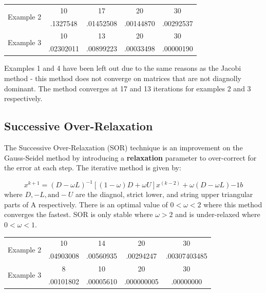 \documentclass[11pt]{article}	%
\begin{document}
\begin{center}
    \begin{tabular}{||c|c|c|c|c||}
        \hline
        \multirow{2}{5em}{Example 2} & 10 & 17 & 20 & 30 \\ [.25em]
        & .1327548 & .01452508 & .00144870 & .00292537 \\ [.25em]
        \hline \hline
        \multirow{2}{5em}{Example 3} & 10 & 13 & 20 & 30 \\ [.25em]
        & .02302011 & .00899223 & .00033498 & .00000190 \\ [.25em]
        \hline
    \end{tabular}
\end{center}
Examples 1 and 4 have been left out due to the same reasons as the Jacobi method - this method does not converge on matrices that are not diagnolly dominant. The method converges at 17 and 13 iterations for examples 2 and 3 respectively.

\subsection{Successive Over-Relaxation}
The Successive Over-Relaxation (SOR) technique is an improvement on the Gauss-Seidel method by introducing a \textbf{relaxation} parameter to over-correct for the error at each step. The iterative method is given by:

\begin{equation}\label{eq:successive-over-relax-eq-1}
    x^{k+1} = (D - \omega L)^{-1}[(1 - \omega)D + \omega U]x^{(k-2)} + \omega(D - \omega L){-1}b
\end{equation}
where $D, -L, \textrm{and} -U$ are the diagnol, strict lower, and string upper triangular parts of A respectively. There is an optimal value of $0 < \omega < 2$ where this method converges the fastest. SOR is only stable where $\omega > 2$ and is under-relaxed where $0 < \omega < 1$.

\begin{center}
    \begin{tabular}{||c|c|c|c|c||}
        \hline
        \multirow{2}{5em}{Example 2} & 10 & 14 &  20 & 30 \\ [.25em]
        & .04903008 & .00560935 & .00294247 & .00307403485 \\ [.25em]
        \hline\hline
        \multirow{2}{5em}{Example 3} & 8 & 10 & 20 & 30 \\ [.25em]
        & .00101802 & .00005610 & .000000005 & .00000000 \\ [.25em]
        \hline
    \end{tabular}
\end{center}
\end{document}
